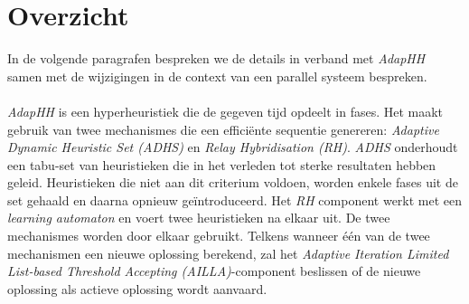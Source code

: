 \section{Overzicht}

In de volgende paragrafen bespreken we de details in verband met \emph{AdapHH} samen met de wijzigingen in de context van een parallel systeem bespreken.

\paragraph{}
\emph{AdapHH} is een hyperheuristiek die de gegeven tijd opdeelt in fases. Het maakt gebruik van twee mechanismes die een effici\"ente sequentie genereren: \emph{Adaptive Dynamic Heuristic Set (ADHS)} en \emph{Relay Hybridisation (RH)}. \emph{ADHS} onderhoudt een tabu-set van heuristieken die in het verleden tot sterke resultaten hebben geleid. Heuristieken die niet aan dit criterium voldoen, worden enkele fases uit de set gehaald en daarna opnieuw ge\"introduceerd. Het \emph{RH} component werkt met een \emph{learning automaton}\cite{RePEc:cla:levarc:481} en voert twee heuristieken na elkaar uit. De twee mechanismes worden door elkaar gebruikt. Telkens wanneer \'e\'en van de twee mechanismen een nieuwe oplossing berekend, zal het \emph{Adaptive Iteration Limited List-based Threshold Accepting (AILLA)}-component beslissen of de nieuwe oplossing als actieve oplossing wordt aanvaard.